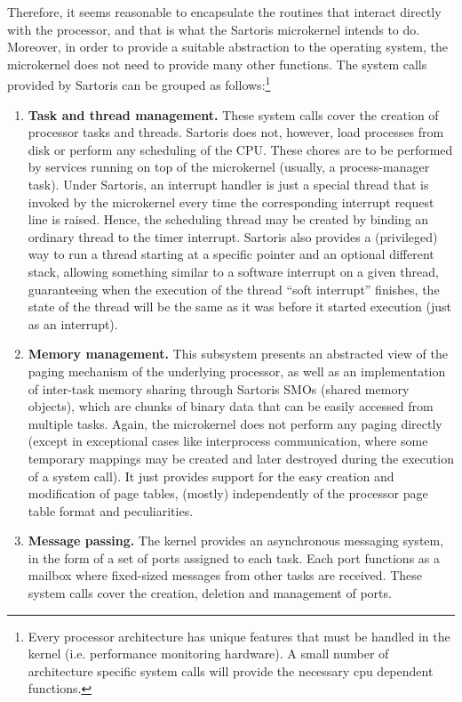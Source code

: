 \documentclass[11pt, letterpaper, twoside, english]{book}
\begin{document}
Therefore, it seems reasonable to encapsulate the routines that interact directly with the processor, and that is what the Sartoris microkernel intends to do. Moreover, in order to provide a suitable abstraction to the operating system, the microkernel does not need to provide many other functions. The system calls provided by Sartoris can be grouped as follows:\footnote{Every processor architecture has unique features that must be handled in the kernel (i.e. performance monitoring hardware). A small number of architecture specific system calls will provide the necessary cpu dependent functions. }

\begin{enumerate}
\item[]\textbf{Task and thread management.} These system calls cover the creation of processor tasks and threads. Sartoris does not, however, load processes from disk or perform any scheduling of the CPU. These chores are to be performed by services running on top of the microkernel (usually, a process-manager task). Under Sartoris, an interrupt handler is just a special thread that is invoked by the microkernel every time the corresponding interrupt request line is raised. Hence, the scheduling thread may be created by binding an ordinary thread to the timer interrupt. Sartoris also provides a (privileged) way to run a thread starting at a specific pointer and an optional different stack, allowing something similar to a software interrupt on a given thread, guaranteeing when the execution of the thread "`soft interrupt"' finishes, the state of the thread will be the same as it was before it started execution (just as an interrupt).
\item[]\textbf{Memory management.} This subsystem presents an abstracted view of the paging mechanism of the underlying processor, as well as an implementation of inter-task memory sharing through Sartoris SMOs (shared memory objects), which are chunks of binary data that can be easily accessed from multiple tasks. Again, the microkernel does not perform any paging directly (except in exceptional cases like interprocess communication, where some temporary mappings may be created and later destroyed during the execution of a system call). It just provides support for the easy creation and modification of page tables, (mostly) independently of the processor page table format and peculiarities.
\item[]\textbf{Message passing.} The kernel provides an asynchronous messaging system, in the form of a set of ports assigned to each task. Each port functions as a mailbox where fixed-sized messages from other tasks are received. These system calls cover the creation, deletion and management of ports.

\end{enumerate}
\end{document}
